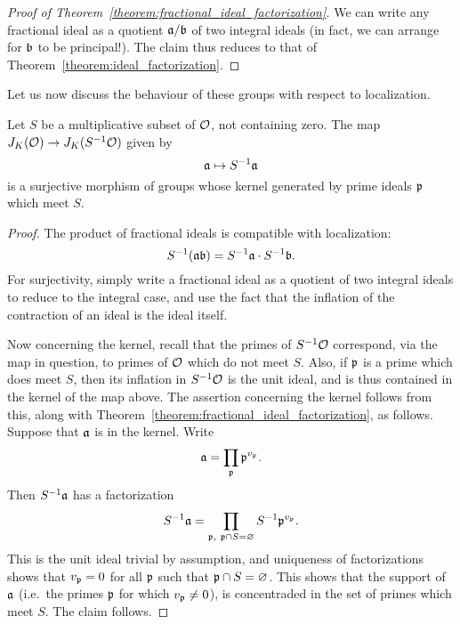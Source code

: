 \begin{proof}[Proof of Theorem~\ref{theorem:fractional_ideal_factorization}]
  We can write any fractional ideal as a quotient $\mathfrak{a} / \mathfrak{b}$ of two integral ideals (in fact, we can arrange for $\mathfrak{b}$ to be principal!).
  The claim thus reduces to that of Theorem~\ref{theorem:ideal_factorization}.
\end{proof}

Let us now discuss the behaviour of these groups with respect to localization.

\begin{proposition}
  Let $S$ be a multiplicative subset of $\mathcal{O}$, not containing zero.
  The map $J_{K}(\mathcal{O}) \to J_{K}(S^{-1}\mathcal{O})$ given by
  \[ \mathfrak{a} \mapsto S^{-1} \mathfrak{a} \]
  is a surjective morphism of groups whose kernel generated by prime ideals $\mathfrak{p}$ which meet $S$.
\end{proposition}
\begin{proof}
  The product of fractional ideals is compatible with localization:
  \[ S^{-1}(\mathfrak{a} \mathfrak{b}) = S^{-1}\mathfrak{a} \cdot S^{-1} \mathfrak{b}. \]
  For surjectivity, simply write a fractional ideal as a quotient of two integral ideals to reduce to the integral case, and use the fact that the inflation of the contraction of an ideal is the ideal itself.

  Now concerning the kernel, recall that the primes of $S^{-1}\mathcal{O}$ correspond, via the map in question, to primes of $\mathcal{O}$ which do not meet $S$.
  Also, if $\mathfrak{p}$ is a prime which does meet $S$, then its inflation in $S^{-1}\mathcal{O}$ is the unit ideal, and is thus contained in the kernel of the map above.
  The assertion concerning the kernel follows from this, along with Theorem~\ref{theorem:fractional_ideal_factorization}, as follows.
  Suppose that $\mathfrak{a}$ is in the kernel.
  Write
  \[ \mathfrak{a} = \prod_{\mathfrak{p}} \mathfrak{p}^{v_{\mathfrak{p}}}. \]
  Then $S^{-1}\mathfrak{a}$ has a factorization
  \[ S^{-1}\mathfrak{a} = \prod_{\mathfrak{p}, \ \mathfrak{p} \cap S = \varnothing} S^{-1}\mathfrak{p}^{v_{\mathfrak{p}}}. \]
  This is the unit ideal trivial by assumption, and uniqueness of factorizations shows that $v_{\mathfrak{p}} = 0$ for all $\mathfrak{p}$ such that $\mathfrak{p} \cap S = \varnothing$.
  This shows that the support of $\mathfrak{a}$ (i.e.~the primes $\mathfrak{p}$ for which $v_{\mathfrak{p}} \neq 0$), is concentraded in the set of primes which meet $S$.
  The claim follows.
\end{proof}

